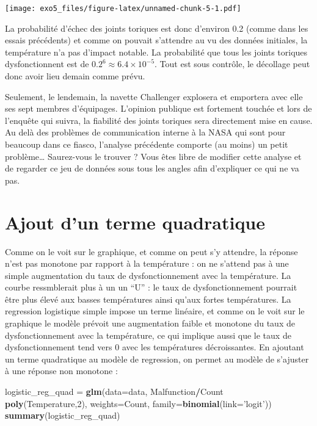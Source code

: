\documentclass[]{article}
\newenvironment{Shaded}{\begin{snugshade}}{\end{snugshade}}
\newcommand{\DataTypeTok}[1]{\textcolor[rgb]{0.13,0.29,0.53}{#1}}
\newcommand{\DecValTok}[1]{\textcolor[rgb]{0.00,0.00,0.81}{#1}}
\newcommand{\KeywordTok}[1]{\textcolor[rgb]{0.13,0.29,0.53}{\textbf{#1}}}
\newcommand{\NormalTok}[1]{#1}
\newcommand{\OperatorTok}[1]{\textcolor[rgb]{0.81,0.36,0.00}{\textbf{#1}}}
\newcommand{\StringTok}[1]{\textcolor[rgb]{0.31,0.60,0.02}{#1}}
\begin{document}
\texttt{[image: exo5\_files/figure-latex/unnamed-chunk-5-1.pdf]}

La probabilité d'échec des joints toriques est donc d'environ 0.2 (comme
dans les essais précédents) et comme on pouvait s'attendre au vu des
données initiales, la température n'a pas d'impact notable. La
probabilité que tous les joints toriques dysfonctionnent est de
\(0.2^6 \approx 6.4\times10^{-5}\). Tout est sous contrôle, le décollage
peut donc avoir lieu demain comme prévu.

Seulement, le lendemain, la navette Challenger explosera et emportera
avec elle ses sept membres d'équipages. L'opinion publique est fortement
touchée et lors de l'enquête qui suivra, la fiabilité des joints
toriques sera directement mise en cause. Au delà des problèmes de
communication interne à la NASA qui sont pour beaucoup dans ce fiasco,
l'analyse précédente comporte (au moins) un petit problème\ldots{}
Saurez-vous le trouver ? Vous êtes libre de modifier cette analyse et de
regarder ce jeu de données sous tous les angles afin d'expliquer ce qui
ne va pas.

\hypertarget{ajout-dun-terme-quadratique}{%
\section{Ajout d'un terme
quadratique}\label{ajout-dun-terme-quadratique}}

Comme on le voit sur le graphique, et comme on peut s'y attendre, la
réponse n'est pas monotone par rapport à la température : on ne s'attend
pas à une simple augmentation du taux de dysfonctionnement avec la
température. La courbe ressmblerait plus à un un ``U'' : le taux de
dysfonctionnement pourrait être plus élevé aux basses températures ainsi
qu'aux fortes températures. La regression logistique simple impose un
terme linéaire, et comme on le voit sur le graphique le modèle prévoit
une augmentation faible et monotone du taux de dysfonctionnement avec la
température, ce qui implique aussi que le taux de dysfonctionnement tend
vers 0 avec les températures décroissantes. En ajoutant un terme
quadratique au modèle de regression, on permet au modèle de s'ajuster à
une réponse non monotone :

\begin{Shaded}
\begin{Highlighting}[]
\NormalTok{logistic_reg_quad =}\StringTok{ }\KeywordTok{glm}\NormalTok{(}\DataTypeTok{data=}\NormalTok{data, Malfunction}\OperatorTok{/}\NormalTok{Count }\OperatorTok{~}\StringTok{ }\KeywordTok{poly}\NormalTok{(Temperature,}\DecValTok{2}\NormalTok{), }\DataTypeTok{weights=}\NormalTok{Count, }
                   \DataTypeTok{family=}\KeywordTok{binomial}\NormalTok{(}\DataTypeTok{link=}\StringTok{'logit'}\NormalTok{))}
\KeywordTok{summary}\NormalTok{(logistic_reg_quad)}
\end{Highlighting}
\end{Shaded}
\end{document}
